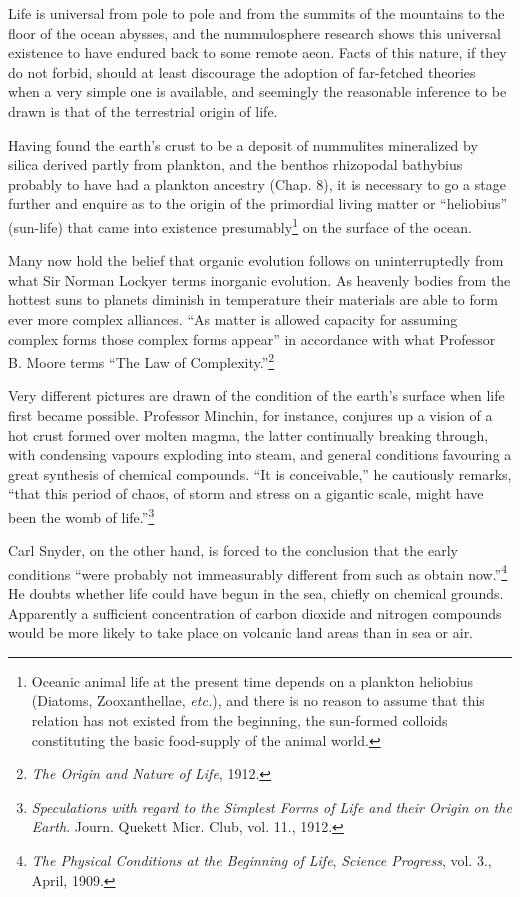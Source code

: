 \documentclass[a4paper, 12pt, oneside]{article}
\begin{document}
Life is universal from pole to pole and from the summits of the mountains to the floor of the ocean abysses, and the nummulosphere research shows this universal existence to have endured back to some remote aeon. Facts of this nature, if they do not forbid, should at least discourage the adoption of far-fetched theories when a very simple one is available, and seemingly the reasonable inference to be drawn is that of the terrestrial origin of life.

Having found the earth's crust to be a deposit of nummulites mineralized by silica derived partly from plankton, and the benthos rhizopodal bathybius probably to have had a plankton ancestry (Chap. 8), it is necessary to go a stage further and enquire as to the origin of the primordial living matter or ``heliobius'' (sun-life) that came into existence presumably\footnote{Oceanic animal life at the present time depends on a plankton heliobius (Diatoms, Zooxanthellae, \emph{etc.}), and there is no reason to assume that this relation has not existed from the beginning, the sun-formed colloids constituting the basic food-supply of the animal world.} on the surface of the ocean.

Many now hold the belief that organic evolution follows on uninterruptedly from what Sir Norman Lockyer terms inorganic evolution. As heavenly bodies from the hottest suns to planets diminish in temperature their materials are able to form ever more complex alliances. ``As matter is allowed capacity for assuming complex forms those complex forms appear'' in accordance with what Professor B. Moore terms ``The Law of Complexity.''\footnote{\emph{The Origin and Nature of Life}, 1912.}

Very different pictures are drawn of the condition of the earth's surface when life first became possible. Professor Minchin, for instance, conjures up a vision of a hot crust formed over molten magma, the latter continually breaking through, with condensing vapours exploding into steam, and general conditions favouring a great synthesis of chemical compounds. ``It is conceivable,'' he cautiously remarks, ``that this period of chaos, of storm and stress on a gigantic scale, might have been the womb of life.''\footnote{\emph{Speculations with regard to the Simplest Forms of Life and their Origin on the Earth}. Journ. Quekett Micr. Club, vol. 11., 1912.}

Carl Snyder, on the other hand, is forced to the conclusion that the early conditions ``were probably not immeasurably different from such as obtain now.''\footnote{\emph{The Physical Conditions at the Beginning of Life}, \emph{Science Progress}, vol. 3., April, 1909.} He doubts whether life could have begun in the sea, chiefly on chemical grounds. Apparently a sufficient concentration of carbon dioxide and nitrogen compounds would be more likely to take place on volcanic land areas than in sea or air.
\end{document}
